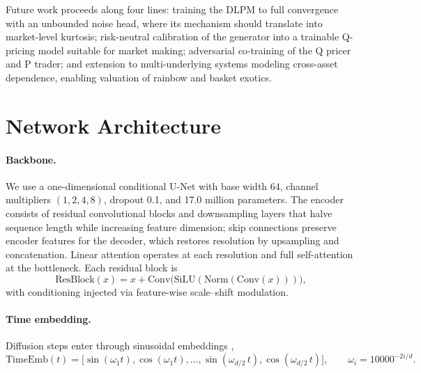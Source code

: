 \documentclass[12pt,letterpaper]{article}
\begin{document}
Future work proceeds along four lines: training the DLPM to full
convergence with an unbounded noise head, where its mechanism should
translate into market-level kurtosis; risk-neutral calibration of the
generator into a trainable Q-pricing model suitable for market making;
adversarial co-training of the Q pricer and P trader; and extension to
multi-underlying systems modeling cross-asset dependence, enabling
valuation of rainbow and basket exotics.

\clearpage
\appendix

\section{Network Architecture}\label{app:architecture}

\paragraph{Backbone.} We use a one-dimensional conditional U-Net
\citep{ronneberger2015unet} with base width 64, channel multipliers
$(1, 2, 4, 8)$, dropout 0.1, and 17.0 million parameters. The encoder
consists of residual convolutional blocks and downsampling layers that halve
sequence length while increasing feature dimension; skip connections
preserve encoder features for the decoder, which restores resolution by
upsampling and concatenation. Linear attention operates at each resolution
and full self-attention at the bottleneck. Each residual block is
\begin{equation}
\mathrm{ResBlock}(x) = x +
\mathrm{Conv}\bigl(\mathrm{SiLU}(\mathrm{Norm}(\mathrm{Conv}(x)))\bigr),
\end{equation}
with conditioning injected via feature-wise scale--shift modulation.

\paragraph{Time embedding.} Diffusion steps enter through sinusoidal
embeddings \citep{vaswani2017attention},
\begin{equation}
\mathrm{TimeEmb}(t) = \bigl[\sin(\omega_1 t), \cos(\omega_1 t), \ldots,
\sin(\omega_{d/2}\, t), \cos(\omega_{d/2}\, t)\bigr],
\qquad \omega_i = 10000^{-2i/d}.
\end{equation}
\end{document}

